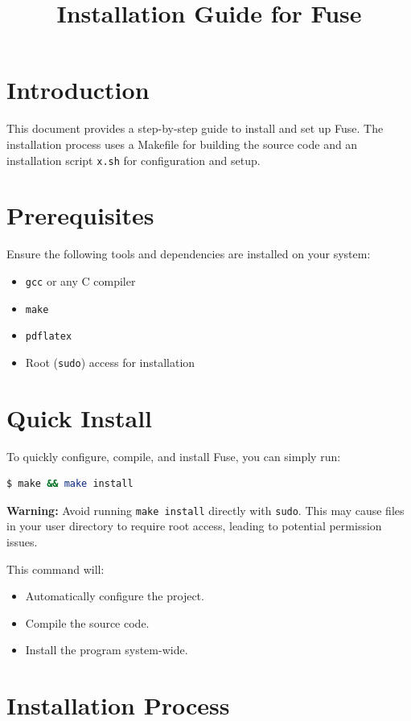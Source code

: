 \documentclass[a4paper,12pt]{article}
\title{\textbf{Installation Guide for Fuse}}
\author{}
\date{}
\begin{document}
\maketitle

\section{Introduction}
This document provides a step-by-step guide to install and set up Fuse. The installation process uses a Makefile for building the source code and an installation script \texttt{x.sh} for configuration and setup.

\section{Prerequisites}
Ensure the following tools and dependencies are installed on your system:
\begin{itemize}
	\item \texttt{gcc} or any C compiler
	\item \texttt{make}
	\item \texttt{pdflatex}
	\item Root (\texttt{sudo}) access for installation
\end{itemize}

\section{Quick Install}
To quickly configure, compile, and install Fuse, you can simply run:
\begin{lstlisting}[language=bash]
$ make && make install
\end{lstlisting}
\textbf{Warning:} Avoid running \texttt{make install} directly with \texttt{sudo}. This may cause files in your user directory to require root access, leading to potential permission issues.

This command will:
\begin{itemize}
	\item Automatically configure the project.
	\item Compile the source code.
	\item Install the program system-wide.
\end{itemize}

\section{Installation Process}
\end{document}
